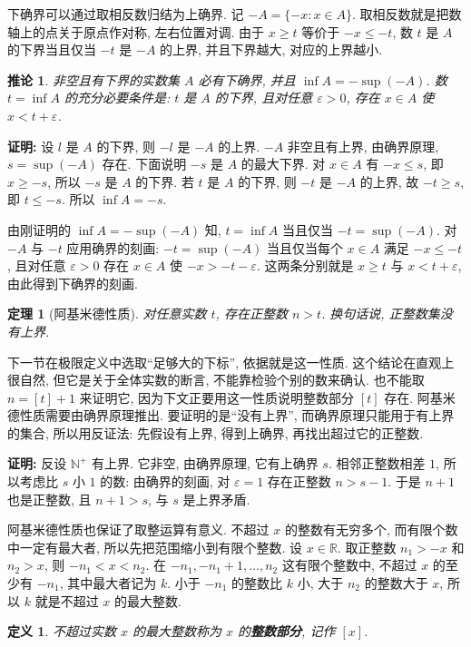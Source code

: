 \documentclass[UTF8,openany]{ctexbook}
\theoremstyle{chinesetextbook}
\newtheorem{definition}{定义}[section]
\newtheorem{theorem}{定理}[section]
\newenvironment{cnproof}{\par\indent\textbf{证明:} \ignorespaces}{\par}
\newtheorem*{corollarysingle}{推论}
\begin{document}
下确界可以通过取相反数归结为上确界. 记 $-A=\{-x:x\in A\}$. 取相反数就是把数轴上的点关于原点作对称, 左右位置对调. 由于 $x\ge t$ 等价于 $-x\le-t$, 数 $t$ 是 $A$ 的下界当且仅当 $-t$ 是 $-A$ 的上界, 并且下界越大, 对应的上界越小.
\begin{corollarysingle}
非空且有下界的实数集 $A$ 必有下确界, 并且 $\inf A=-\sup(-A)$. 数 $t=\inf A$ 的充分必要条件是: $t$ 是 $A$ 的下界, 且对任意 $\varepsilon>0$, 存在 $x\in A$ 使 $x<t+\varepsilon$.
\end{corollarysingle}
\begin{cnproof}
设 $l$ 是 $A$ 的下界, 则 $-l$ 是 $-A$ 的上界. $-A$ 非空且有上界, 由确界原理, $s=\sup(-A)$ 存在. 下面说明 $-s$ 是 $A$ 的最大下界. 对 $x\in A$ 有 $-x\le s$, 即 $x\ge-s$, 所以 $-s$ 是 $A$ 的下界. 若 $t$ 是 $A$ 的下界, 则 $-t$ 是 $-A$ 的上界, 故 $-t\ge s$, 即 $t\le-s$. 所以 $\inf A=-s$.

由刚证明的 $\inf A=-\sup(-A)$ 知, $t=\inf A$ 当且仅当 $-t=\sup(-A)$. 对 $-A$ 与 $-t$ 应用确界的刻画: $-t=\sup(-A)$ 当且仅当每个 $x\in A$ 满足 $-x\le-t$, 且对任意 $\varepsilon>0$ 存在 $x\in A$ 使 $-x>-t-\varepsilon$. 这两条分别就是 $x\ge t$ 与 $x<t+\varepsilon$, 由此得到下确界的刻画.
\end{cnproof}
\begin{theorem}[阿基米德性质]
对任意实数 $t$, 存在正整数 $n>t$. 换句话说, 正整数集没有上界.
\end{theorem}
下一节在极限定义中选取“足够大的下标”, 依据就是这一性质. 这个结论在直观上很自然, 但它是关于全体实数的断言, 不能靠检验个别的数来确认. 也不能取 $n=[t]+1$ 来证明它, 因为下文正要用这一性质说明整数部分 $[t]$ 存在. 阿基米德性质需要由确界原理推出. 要证明的是“没有上界”, 而确界原理只能用于有上界的集合, 所以用反证法: 先假设有上界, 得到上确界, 再找出超过它的正整数.
\begin{cnproof}
反设 $\mathbb N^+$ 有上界. 它非空, 由确界原理, 它有上确界 $s$. 相邻正整数相差 $1$, 所以考虑比 $s$ 小 $1$ 的数: 由确界的刻画, 对 $\varepsilon=1$ 存在正整数 $n>s-1$. 于是 $n+1$ 也是正整数, 且 $n+1>s$, 与 $s$ 是上界矛盾.
\end{cnproof}
阿基米德性质也保证了取整运算有意义. 不超过 $x$ 的整数有无穷多个, 而有限个数中一定有最大者, 所以先把范围缩小到有限个整数. 设 $x\in\mathbb R$. 取正整数 $n_1>-x$ 和 $n_2>x$, 则 $-n_1<x<n_2$. 在 $-n_1,-n_1+1,\ldots,n_2$ 这有限个整数中, 不超过 $x$ 的至少有 $-n_1$, 其中最大者记为 $k$. 小于 $-n_1$ 的整数比 $k$ 小, 大于 $n_2$ 的整数大于 $x$, 所以 $k$ 就是不超过 $x$ 的最大整数.
\begin{definition}
不超过实数 $x$ 的最大整数称为 $x$ 的\textbf{整数部分}, 记作 $[x]$.
\end{definition}
\end{document}
